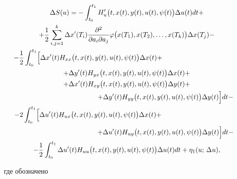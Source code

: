 \begin{multline}

\Delta S(u)=-\int_{t_{0}}^{t_{1}} H'_{u} \bigl(t, x(t), y(t), u(t), \psi (t)\bigr) \Delta u(t) dt+

\\

+

 \frac{1}{2}  \sum_{i,j=1}^{k} \Delta x'(T_{i})  

 \dfrac{\partial^{2}  } {\partial a_{i} \partial a_{j}} 

\varphi\bigl(x(T_{1}), x(T_{2}), \ldots, x(T_{k})\bigr) 

 \Delta x(T_{j}) -  \\

- \frac{1}{2} \int_{t_{0}}^{t_{1}} 

\Bigl[ \Delta x'(t) H_{xx} \bigl(t, x(t), y(t), u(t), \psi (t)\bigr) \Delta x(t) +

\hspace{4cm}

\\

 +\Delta y'(t) H_{yx} \bigl(t, x(t), y(t), u(t), \psi (t)\bigr) \Delta x(t)+  \\

 +\Delta x'(t) H_{xy} \bigl(t, x(t), y(t), u(t), \psi (t)\bigr) \Delta y(t)+  \\ 

\hspace{4cm} +\Delta y'(t) H_{yy} \bigl(t, x(t), y(t), u(t), \psi (t)\bigr) \Delta y(t)\Bigr]  dt -  \\

-2 \int_{t_{0}}^{t_{1}} 

\Bigl[ \Delta u'(t) H_{ux} \bigl(t, x(t), y(t), u(t), \psi (t)\bigr) \Delta x(t) + \hspace{4cm} \\

\hspace{4cm}  +\Delta u'(t) H_{uy} \bigl(t, x(t), y(t), u(t), \psi (t)\bigr) \Delta y(t) \Bigr] dt - \\

-\frac{1}{2} \int_{t_{0}}^{t_{1}} 

\Delta u'(t) H_{uu} \bigl(t, x(t), y(t), u(t), \psi (t)\bigr) \Delta u(t) dt + \eta_{1} (u; \, \Delta u) , 

\label{mans:eq11}

\end{multline} 

где обозначено

